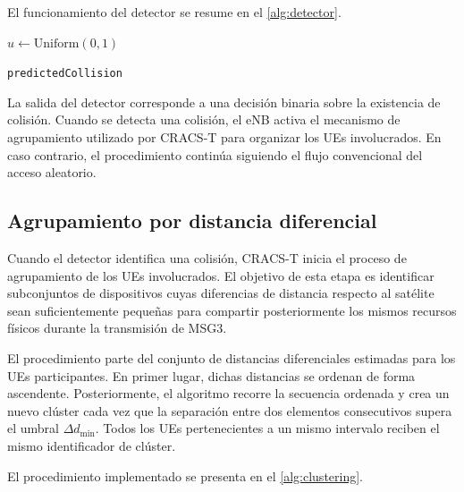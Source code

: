 El funcionamiento del detector se resume en el \cref{alg:detector}.

\begin{algorithm}[H]
\DontPrintSemicolon
\caption{Detector probabilístico de colisión}
\label{alg:detector}


$u \leftarrow \mathrm{Uniform}(0,1)$\;


\Return \texttt{predictedCollision}\;

\end{algorithm}

La salida del detector corresponde a una decisión binaria sobre la existencia de colisión. Cuando se detecta una colisión, el eNB activa el mecanismo de agrupamiento utilizado por CRACS-T para organizar los UEs involucrados. En caso contrario, el procedimiento continúa siguiendo el flujo convencional del acceso aleatorio.


\subsection{Agrupamiento por distancia diferencial}
\label{sec:impl_clustering}

Cuando el detector identifica una colisión, CRACS-T inicia el proceso de agrupamiento de los UEs involucrados. El objetivo de esta etapa es identificar subconjuntos de dispositivos cuyas diferencias de distancia respecto al satélite sean suficientemente pequeñas para compartir posteriormente los mismos recursos físicos durante la transmisión de MSG3.

El procedimiento parte del conjunto de distancias diferenciales estimadas para los UEs participantes. En primer lugar, dichas distancias se ordenan de forma ascendente. Posteriormente, el algoritmo recorre la secuencia ordenada y crea un nuevo clúster cada vez que la separación entre dos elementos consecutivos supera el umbral $\Delta d_{\min}$. Todos los UEs pertenecientes a un mismo intervalo reciben el mismo identificador de clúster.

El procedimiento implementado se presenta en el \cref{alg:clustering}.

